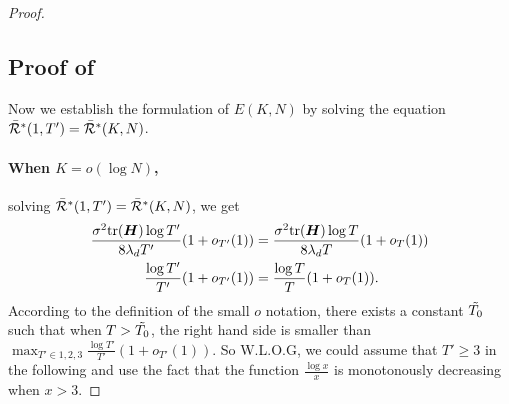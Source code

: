 \begin{proof}
\subsection{Proof of }
Now we establish the formulation of $E(K,N)$ by solving the equation $\Bar{\mathcal{R}}^*(1,T')=\Bar{\mathcal{R}}^*(K, N)$.

\paragraph{When $K = o(\log N)$,}
solving $\Bar{\mathcal{R}}^*(1,T')=\Bar{\mathcal{R}}^*(K, N)$, we get 
\begin{align}
    \frac{\sigma^2\mathrm{tr}({\bm{H}})\log T'}{8\lambda_d T'}(1+o_{T'}(1))&=\frac{\sigma^2\mathrm{tr}({\bm{H}})\log T}{8\lambda_d T}(1+o_T(1)) \notag\\
    \frac{\log T'}{T'}(1+o_{T'}(1))&=\frac{\log T}{T}(1+o_T(1)). \label{equ:K-small-solve}
\end{align}
According to the definition of the small $o$ notation, there exists a constant $\Tilde{T_0}$ such that when $T>\Tilde{T_0}$, the right hand side is smaller than $\max_{T'\in{1, 2, 3}}\frac{\log T'}{T'}(1+o_{T'}(1))$. So W.L.O.G, we could assume that $T'\geq 3$ in the following and use the fact that the function $\frac{\log x}{x}$ is monotonously decreasing when $x > 3$.


\end{proof}
